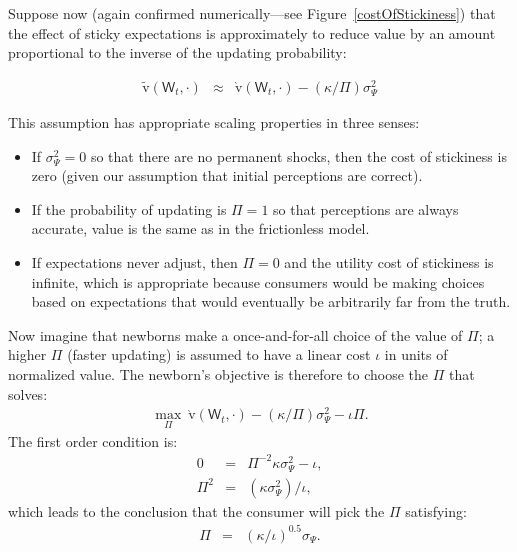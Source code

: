 \documentclass[titlepage]{./econtex}
\begin{document}
Suppose now (again confirmed numerically---see Figure~\ref{costOfStickiness}) that the effect of sticky expectations is approximately to reduce value by an amount proportional to the inverse of the updating probability:

\begin{eqnarray}
  \label{eq:vBar}
   \widetilde{\mathrm{v}}(\mathsf{W}_t,\cdot) & \approx & \grave{\mathrm{v}}(\mathsf{W}_t,\cdot)-(\kappa/\Pi)\sigma^{2}_{\Psi} \label{eq:vApproxSticky}
\end{eqnarray}
 
This assumption has appropriate scaling properties in three senses:
\begin{itemize}
\item If $\sigma^{2}_{\Psi}=0$ so that there are no permanent shocks, then
the cost of stickiness is zero (given our assumption that initial perceptions are correct).
\item If the probability of updating is $\Pi=1$ so that perceptions
are always accurate, value is the same as in the frictionless model.
\item If expectations never adjust, then $\Pi=0$ and the utility cost of stickiness is infinite,
which is appropriate because consumers would be making choices based on
expectations that would eventually be arbitrarily far from the truth.
\end{itemize}

Now imagine that newborns make a once-and-for-all choice of the value of $\Pi$; a higher $\Pi$ (faster updating) is assumed to have a linear cost $\iota$ in units of normalized value. The newborn's objective is therefore to choose the $\Pi$ that solves:
\begin{eqnarray*}
   \max_{\Pi} ~ \grave{\mathrm{v}}(\mathsf{W}_t,\cdot)-(\kappa/\Pi)\sigma^{2}_{\Psi}-\iota\Pi. \label{eq:pickPi}
\end{eqnarray*}
 The first order condition is:
\begin{eqnarray*}
     0 & = & \Pi^{-2}\kappa\sigma^{2}_{\Psi}-\iota,
\\  \Pi^{2} & = & (\kappa \sigma^{2}_{\Psi})/\iota,
\end{eqnarray*}
which leads to the conclusion that the consumer will
pick the $\Pi$ satisfying:
\begin{eqnarray*}
  \Pi & = &  (\kappa/\iota)^{0.5} \sigma_{\Psi}. \label{eq:bestPi}
\end{eqnarray*}
 
\end{document}
